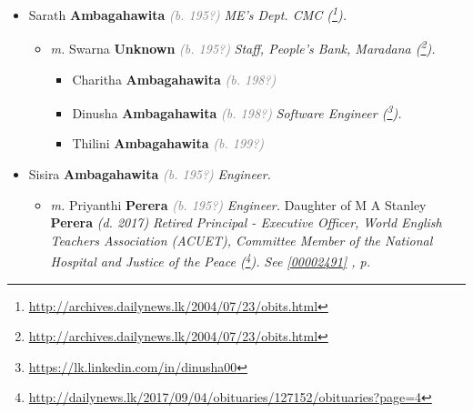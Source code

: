 \documentclass[10pt, openany]{book}
\begin{document}
\begin{itemize}
{\begin{itemize}
{\begin{itemize}
{\begin{itemize}
{\begin{itemize}
{\begin{itemize}
{ }
\end{itemize}}
\end{itemize}
 }
\item{Kanchana \textbf{Ambagahawita} \textcolor{slorange}{\textit{(b. 1982)}} \textcolor{slmaroon}{\textit{Senior Economist, Central Bank of Sri Lanka 2019).}}
\begin{itemize}
\item{\textcolor{slteal}{\textit{See  \autoref{couple:00000080:00000759} \textit{, p. \pageref{couple:00000080:00000759} }}}}
\end{itemize}
 }
\end{itemize}}
\end{itemize}
  }
\item{Sarath \textbf{Ambagahawita} \textcolor{gray}{\textit{(b. 195?)}} \textcolor{slmaroon}{\textit{ME's Dept. CMC (\footnote{\url{http://archives.dailynews.lk/2004/07/23/obits.html}}).}}
\begin{itemize}
\item{\textit{m.} Swarna \textbf{Unknown} \textcolor{gray}{\textit{(b. 195?)}} \textcolor{slmaroon}{\textit{Staff, People's Bank, Maradana (\footnote{\url{http://archives.dailynews.lk/2004/07/23/obits.html}}).}}   \label{couple:00000087:00000911} \begin{itemize}
\item{Charitha \textbf{Ambagahawita} \textcolor{gray}{\textit{(b. 198?)}}
 }
\item{Dinusha \textbf{Ambagahawita} \textcolor{gray}{\textit{(b. 198?)}} \textcolor{slmaroon}{\textit{Software Engineer (\footnote{\url{https://lk.linkedin.com/in/dinusha00}}).}}
 }
\item{Thilini \textbf{Ambagahawita} \textcolor{gray}{\textit{(b. 199?)}}
 }
\end{itemize}}
\end{itemize}
 }
\item{Sisira \textbf{Ambagahawita} \textcolor{gray}{\textit{(b. 195?)}} \textcolor{slmaroon}{\textit{Engineer.}}
\begin{itemize}
\item{\textit{m.} Priyanthi \textbf{Perera} \textcolor{gray}{\textit{(b. 195?)}} \textcolor{slmaroon}{\textit{Engineer.}} Daughter of  M A Stanley \textbf{Perera} \textcolor{slorange}{\textit{(d. 2017)}} \textcolor{slmaroon}{\textit{Retired Principal - Executive Officer, World English Teachers Association (ACUET), Committee Member of the National Hospital and Justice of the Peace (\footnote{\url{http://dailynews.lk/2017/09/04/obituaries/127152/obituaries?page=4}}).}} \textcolor{slteal}{\textit{See  \autoref{00002491} \textit{, p. \pageref{00002491} }}}   \label{couple:00000089:00000606} \begin{itemize}

\end{itemize}}
\end{itemize}}
\end{itemize}}
\end{itemize}
\end{document}
